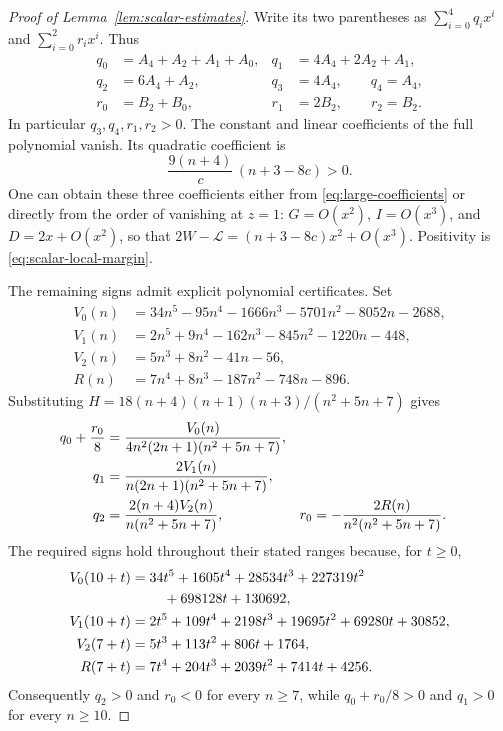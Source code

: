 \begin{proof}[Proof of Lemma~\ref{lem:scalar-estimates}]
Write its two parentheses as $\sum_{i=0}^4q_ix^i$ and
$\sum_{i=0}^2r_ix^i$.  Thus
\begin{align*}
 q_0&=A_4+A_2+A_1+A_0,&q_1&=4A_4+2A_2+A_1,\\
 q_2&=6A_4+A_2,&q_3&=4A_4,\qquad q_4=A_4,\\
 r_0&=B_2+B_0,&r_1&=2B_2,\qquad r_2=B_2.
\end{align*}
In particular $q_3,q_4,r_1,r_2>0$.  The constant and linear
coefficients of the full polynomial vanish.  Its quadratic coefficient
is
\begin{equation}\label{eq:large-quadratic}
 \frac{9(n+4)}c\,(n+3-8c)>0.
\end{equation}
One can obtain these three coefficients either from
\eqref{eq:large-coefficients} or directly from the order of vanishing at
$z=1$: $G=O(x^2)$, $I=O(x^3)$, and $D=2x+O(x^2)$, so that
$2W-\mathcal L=(n+3-8c)x^2+O(x^3)$.  Positivity is
\eqref{eq:scalar-local-margin}.

The remaining signs admit explicit polynomial certificates.  Set
\begin{align*}
 V_0(n)&=34n^5-95n^4-1666n^3-5701n^2-8052n-2688,\\
 V_1(n)&=2n^5+9n^4-162n^3-845n^2-1220n-448,\\
 V_2(n)&=5n^3+8n^2-41n-56,\\
 R(n)&=7n^4+8n^3-187n^2-748n-896.
\end{align*}
Substituting $H=18(n+4)(n+1)(n+3)/(n^2+5n+7)$ gives
\begin{align}
 q_0+\frac{r_0}{8}
 &=\frac{V_0(n)}{4n^2(2n+1)(n^2+5n+7)},\notag\\
 q_1&=\frac{2V_1(n)}{n(2n+1)(n^2+5n+7)},\notag\\
 q_2&=\frac{2(n+4)V_2(n)}{n(n^2+5n+7)},&
 r_0&=-\frac{2R(n)}{n^2(n^2+5n+7)}.
 \label{eq:large-signs}
\end{align}
The required signs hold throughout their stated ranges because, for
$t\ge0$,
\begin{align}
 V_0(10+t)={}&34t^5+1605t^4+28534t^3
                  +227319t^2\notag\\
             &\quad+698128t+130692,\notag\\
 V_1(10+t)={}&2t^5+109t^4+2198t^3+19695t^2
                  +69280t+30852,\notag\\
 V_2(7+t)={}&5t^3+113t^2+806t+1764,\notag\\
 R(7+t)={}&7t^4+204t^3+2039t^2+7414t+4256.
 \label{eq:shift-certificates}
\end{align}
Consequently $q_2>0$ and $r_0<0$ for every $n\ge7$, while
$q_0+r_0/8>0$ and $q_1>0$ for every $n\ge10$.


\end{proof}
